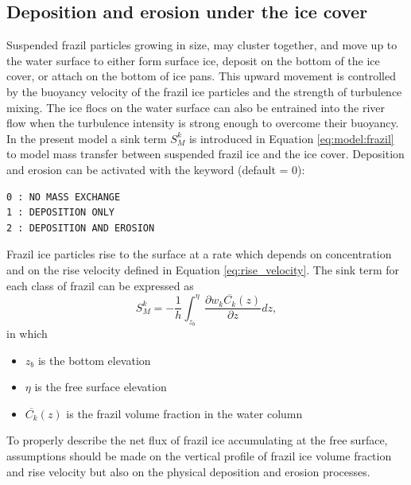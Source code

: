 \subsection{Deposition and erosion under the ice cover}
\label{section:precipitation}

Suspended frazil particles growing in size, may cluster
together, and move up to the water surface to either form surface ice, deposit on the bottom
of the ice cover, or attach on the bottom of ice pans. This upward movement is controlled by the
buoyancy velocity of the frazil ice particles and the strength of turbulence mixing. The ice flocs
on the water surface can also be entrained into the river flow when the turbulence intensity is
strong enough to overcome their buoyancy.
In the present model a sink term $S_M^k$ is introduced in Equation \ref{eq:model:frazil} to model mass transfer between suspended frazil ice and the ice cover.
Deposition and erosion can be activated with the keyword  (default = 0):
\begin{lstlisting}
0 : NO MASS EXCHANGE
1 : DEPOSITION ONLY
2 : DEPOSITION AND EROSION
\end{lstlisting}

Frazil ice particles rise to the surface at a rate which depends on concentration and on the rise velocity defined in Equation \ref{eq:rise_velocity}. 
The sink term for each class of frazil can be expressed as
\begin{equation}
S_M^k = -\dfrac{1}{h} \int_{z_b}^{\eta} \dfrac{ \partial w_k \overline{C_k}(z)}{ \partial z}  dz,
\end{equation}
in which
\begin{itemize}
	\item $z_b$ is the bottom elevation
	\item $\eta$ is the free surface elevation
	\item $\overline{C_k}(z)$ is the frazil volume fraction in the water column
\end{itemize}

To properly describe the net flux of frazil ice accumulating at the free surface, assumptions  
should be made on the vertical profile of frazil ice volume fraction and rise velocity but also on the physical deposition and erosion processes. \newline

